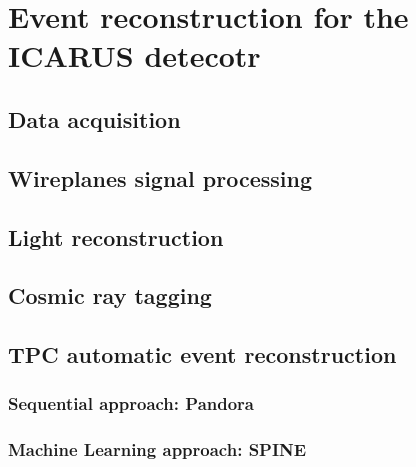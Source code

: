 
\chapter{Event reconstruction for the ICARUS detecotr}
\label{chap:event_reconstruction}

\section{Data acquisition}

\section{Wireplanes signal processing}

\section{Light reconstruction}

\section{Cosmic ray tagging}

\section{TPC automatic event reconstruction}

\subsection{Sequential approach: Pandora}

\subsection{Machine Learning approach: SPINE}